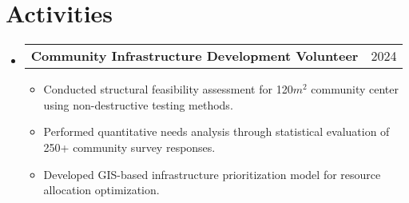 \documentclass[letterpaper,11pt]{article}
\makeatletter
\newcommand{\resumeItem}[1]{\item\small{{#1 \vspace{-2pt}}}}
\newcommand{\resumeProjectHeading}[2]{\item\begin{tabular*}{0.97\textwidth}{l@{\extracolsep{\fill}}r}\small#1 & #2 \\
\end{tabular*}\vspace{-7pt}}
\newcommand{\resumeSubHeadingListStart}{\begin{itemize}[leftmargin=0.15in, label={}]}
\newcommand{\resumeSubHeadingListEnd}{\end{itemize}}
\newcommand{\resumeItemListStart}{\begin{itemize}}
\newcommand{\resumeItemListEnd}{\end{itemize}\vspace{-5pt}}
\makeatother
\begin{document}
\section{Activities}
  \resumeSubHeadingListStart
        \resumeProjectHeading{\textbf{Community Infrastructure Development Volunteer}}{2024}
          \resumeItemListStart
            \resumeItem{Conducted structural feasibility assessment for 120$m^2$ community center using non-destructive testing methods.}
            \resumeItem{Performed quantitative needs analysis through statistical evaluation of 250+ community survey responses.}
            \resumeItem{Developed GIS-based infrastructure prioritization model for resource allocation optimization.}
          \resumeItemListEnd
    \resumeSubHeadingListEnd
\end{document}
